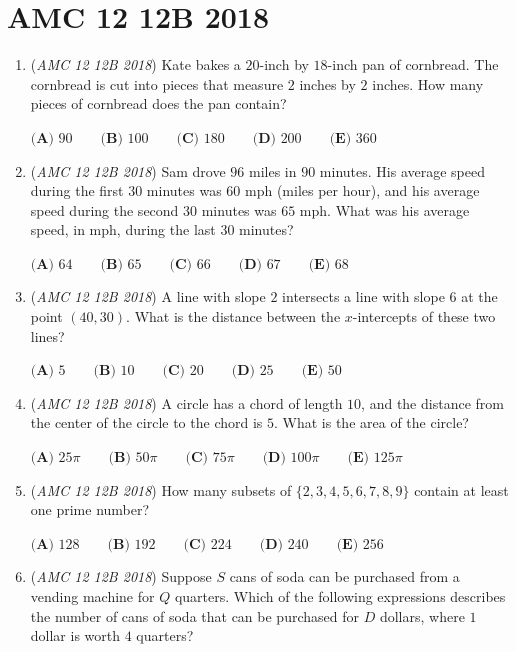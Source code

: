 \section{AMC 12 12B 2018}
        \begin{enumerate}
        	\item (\textit{AMC 12 12B 2018}) Kate bakes a $20$-inch by $18$-inch pan of cornbread. The cornbread is cut into pieces that measure $2$ inches by $2$ inches. How many pieces of cornbread does the pan contain?


 $\textbf{(A) } 90 \qquad \textbf{(B) } 100 \qquad \textbf{(C) } 180 \qquad \textbf{(D) } 200 \qquad \textbf{(E) } 360$


	\item (\textit{AMC 12 12B 2018}) Sam drove $96$ miles in $90$ minutes. His average speed during the first $30$ minutes was $60$ mph (miles per hour), and his average speed during the second $30$ minutes was $65$ mph. What was his average speed, in mph, during the last $30$ minutes?


 $\textbf{(A) } 64 \qquad \textbf{(B) } 65 \qquad \textbf{(C) } 66 \qquad \textbf{(D) } 67 \qquad \textbf{(E) } 68$


	\item (\textit{AMC 12 12B 2018}) A line with slope $2$ intersects a line with slope $6$ at the point $(40,30)$. What is the distance between the $x$-intercepts of these two lines? 


 $\textbf{(A) } 5 \qquad \textbf{(B) } 10 \qquad \textbf{(C) } 20 \qquad \textbf{(D) } 25 \qquad \textbf{(E) } 50$


	\item (\textit{AMC 12 12B 2018}) A circle has a chord of length $10$, and the distance from the center of the circle to the chord is $5$. What is the area of the circle?


 $\textbf{(A) }25\pi \qquad \textbf{(B) }50\pi \qquad \textbf{(C) }75\pi \qquad \textbf{(D) }100\pi \qquad \textbf{(E) }125\pi \qquad$


	\item (\textit{AMC 12 12B 2018}) How many subsets of $\{2,3,4,5,6,7,8,9\}$ contain at least one prime number?


 $\textbf{(A) } 128 \qquad \textbf{(B) } 192 \qquad \textbf{(C) } 224 \qquad \textbf{(D) } 240 \qquad \textbf{(E) } 256$


	\item (\textit{AMC 12 12B 2018}) Suppose $S$ cans of soda can be purchased from a vending machine for $Q$ quarters. Which of the following expressions describes the number of cans of soda that can be purchased for $D$ dollars, where $1$ dollar is worth $4$ quarters?



\end{enumerate}
